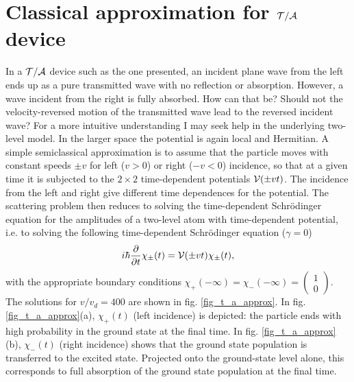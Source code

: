 \section{Classical approximation for ${\cal T/A}$ device \label{sec:chapter3_class}}
%
%
In a ${\cal T/A}$ device such as the one presented, an incident plane wave from the left ends up as a pure transmitted wave with no reflection or absorption.
However, a wave incident from the right is fully absorbed. How can that be? Should not the velocity-reversed motion
of the transmitted wave lead to the reversed incident wave?
For a more intuitive understanding I may seek help in the underlying two-level model.
In the larger space the potential is again local and Hermitian. A simple semiclassical
approximation is to assume that the particle moves with  constant speeds $\pm v$ for left ($v>0$) or right ($-v<0$) incidence,  so that at a given time it is subjected to  the $2\times2$ time-dependent potentials
${\cal V}(\pm vt)$. The incidence from the left and right give different time dependences for the potential. The scattering problem then reduces to solving the time-dependent Schr\"odinger equation for the amplitudes of a two-level atom with time-dependent potential, i.e. to solving the following time-dependent Schr\"odinger equation ($\gamma = 0$)
%
\begin{eqnarray}
  i \hbar \frac{\partial}{\partial t} \chi_\pm(t)
  = {\cal V} (\pm v t) \chi_\pm(t),
\end{eqnarray}
%
with the appropriate boundary conditions $\chi_+ (-\infty) = \chi_- (-\infty) =\left(\begin{smallmatrix} 1\\ 0\end{smallmatrix}\right)$. The  solutions for $v/v_d = 400$
are shown in fig. \ref{fig_t_a_approx}.
In fig. \ref{fig_t_a_approx}(a), $\chi_+ (t)$ (left incidence) is depicted:  the particle ends  with high probability in the ground state at the final time. In fig. \ref{fig_t_a_approx}(b), $\chi_- (t)$ (right incidence) shows that the ground state population is transferred to the excited state. Projected onto the ground-state level alone,
this corresponds to full absorption of the ground state population at the final time.

